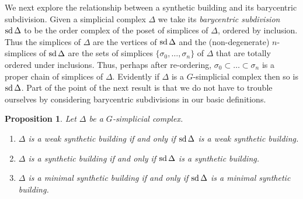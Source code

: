 \documentclass[12pt]{amsart}
\theoremstyle{plain}
\newtheorem{proposition}[theorem]{Proposition}
\theoremstyle{definition}
\theoremstyle{remark}
\numberwithin{equation}{section}
\def \sd{\mathop{\rm sd}}
\begin{document}
We next explore the relationship between a synthetic building and its barycentric subdivision. Given a simplicial complex $\Delta$ we take its \textit{barycentric subdivision} $\sd \Delta$ to be the order complex of the poset of simplices of $\Delta$, ordered by inclusion. Thus the simplices of $\Delta$ are the vertices of $\sd\Delta$ and the (non-degenerate) $n$-simplices of $\sd\Delta$ are the sets of simplices $\{\sigma_0,\ldots,\sigma_n\}$ of $\Delta$ that are totally ordered under inclusions. Thus, perhaps after re-ordering, $\sigma_0\subset\ldots \subset\sigma_n$ is a proper chain of simplices of $\Delta$. Evidently if $\Delta$ is a $G$-simplicial complex then so is $\sd\Delta$. Part of the point of the next result is that we do not have to trouble ourselves by considering barycentric subdivisions in our basic definitions.

\begin{proposition}
\label{subdivision-proposition}
    Let $\Delta$ be a $G$-simplicial complex.
    \begin{enumerate}
        \item $\Delta$ is a weak synthetic building if and only if $\sd\Delta$ is a weak synthetic building.
        \item $\Delta$ is a synthetic building if and only if $\sd\Delta$ is a synthetic building.
 \item $\Delta$ is a minimal synthetic building if and only if $\sd\Delta$ is a minimal synthetic building.
    \end{enumerate}
\end{proposition}
\end{document}
